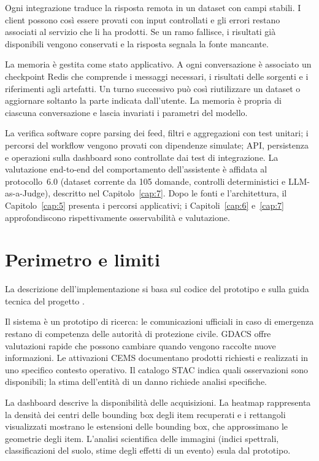Ogni integrazione traduce la risposta remota in un dataset con campi stabili. I
client possono così essere provati con input controllati e gli errori restano
associati al servizio che li ha prodotti. Se un ramo fallisce, i risultati già
disponibili vengono conservati e la risposta segnala la fonte mancante.

La memoria è gestita come stato applicativo. A ogni conversazione è associato
un checkpoint Redis che comprende i messaggi necessari, i risultati delle
sorgenti e i riferimenti agli artefatti. Un turno successivo può così
riutilizzare un dataset o aggiornare soltanto la parte indicata dall'utente.
La memoria è propria di ciascuna conversazione e lascia invariati i parametri
del modello.

La verifica software copre parsing dei feed, filtri e aggregazioni con test
unitari; i percorsi del workflow vengono provati con dipendenze simulate; API,
persistenza e operazioni sulla dashboard sono controllate dai test di
integrazione. La valutazione end-to-end del comportamento dell'assistente è affidata al
protocollo~6.0 (dataset corrente da 105 domande, controlli deterministici e
LLM-as-a-Judge), descritto nel Capitolo~\ref{cap:7}. Dopo le fonti e
l'architettura, il Capitolo~\ref{cap:5} presenta i percorsi applicativi; i
Capitoli~\ref{cap:6} e~\ref{cap:7} approfondiscono rispettivamente
osservabilità e valutazione.

\section{Perimetro e limiti}

La descrizione dell'implementazione si basa sul codice del prototipo e sulla
guida tecnica del progetto \cite{guidaProgetto2026}.

Il sistema è un prototipo di ricerca: le comunicazioni ufficiali in caso di
emergenza restano di competenza delle autorità di protezione civile. GDACS
offre valutazioni rapide che possono cambiare quando vengono raccolte nuove
informazioni. Le attivazioni CEMS documentano prodotti richiesti e realizzati in
uno specifico contesto operativo. Il catalogo STAC indica quali osservazioni
sono disponibili; la stima dell'entità di un danno richiede analisi specifiche.

La dashboard descrive la disponibilità delle acquisizioni. La heatmap
rappresenta la densità dei centri delle bounding box degli item recuperati e i
rettangoli visualizzati mostrano le estensioni delle bounding box, che
approssimano le geometrie degli item. L'analisi scientifica delle immagini
(indici spettrali, classificazioni del suolo, stime degli effetti di un evento)
esula dal prototipo.

